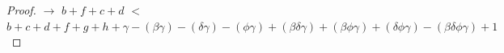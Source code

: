 \documentclass[manuscript]{acmart}
\begin{document}
\begin{proof}
        $\rightarrow$
        $b + f + c + d$
        $<$
        $b + c + d + f + g + h 
        + \gamma
        - (\beta \gamma) - (\delta \gamma) - (\phi \gamma)
        + (\beta \delta \gamma) + (\beta \phi \gamma) + (\delta \phi \gamma)
        - (\beta \delta \phi \gamma)
        + 1
        $




\end{proof}
\end{document}
